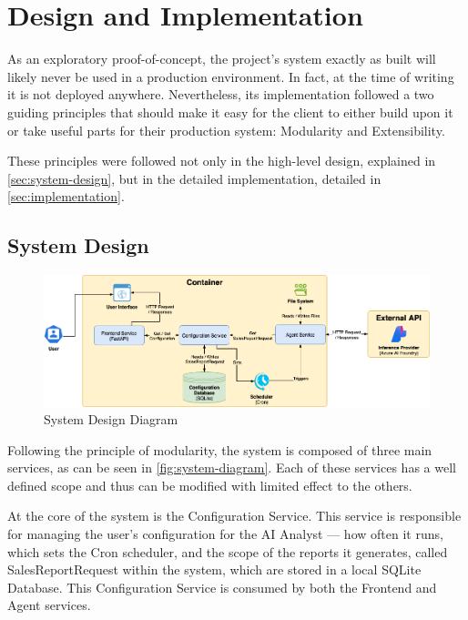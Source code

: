 \documentclass[a4paper]{report}
\begin{document}
\chapter{Design and Implementation}
\label{chapter:design-implementation}

As an exploratory proof-of-concept, the project's system exactly as built will likely never be used in a production environment. In fact, at the time of writing it is not deployed anywhere. Nevertheless, its implementation followed a two guiding principles that should make it easy for the client to either build upon it or take useful parts for their production system: Modularity and Extensibility.

These principles were followed not only in the high-level design, explained in \autoref{sec:system-design}, but in the detailed implementation, detailed in \autoref{sec:implementation}.

\section{System Design}
\label{sec:system-design}

\begin{figure}[h]
\centering
\includegraphics[width=1\textwidth]{images/system-diagram.png}
\caption{System Design Diagram}
\label{fig:system-diagram}
\end{figure}

Following the principle of modularity, the system is composed of three main services, as can be seen in \autoref{fig:system-diagram}. Each of these services has a well defined scope and thus can be modified with limited effect to the others.

At the core of the system is the Configuration Service. This service is responsible for managing the user's configuration for the AI Analyst --- how often it runs, which sets the Cron scheduler, and the scope of the reports it generates, called SalesReportRequest within the system, which are stored in a local SQLite Database. This Configuration Service is consumed by both the Frontend and Agent services.
\end{document}

